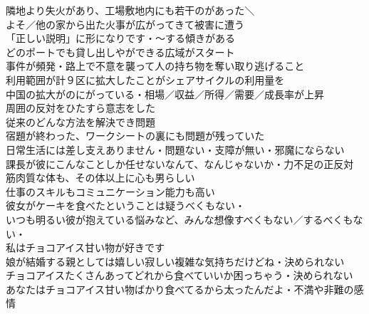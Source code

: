 隣地より失火があり、工場敷地内にも若干のがあった＼\\
よそ／他の家から出た火事が広がってきて被害に遭う\\
「正しい説明」に形になりです・〜する傾きがある\\
どのポートでも貸し出しやができる広域がスタート\\
事件が頻発・路上で不意を襲って人の持ち物を奪い取り逃げること\\
利用範囲が計９区に拡大したことがシェアサイクルの利用量を\\
中国の拡大がのにがっている・相場／収益／所得／需要／成長率が上昇\\

周囲の反対をひたすら意志をした\\
従来のどんな方法を解決でき問題\\
宿題が終わった、ワークシートの裏にも問題が残っていた\\
日常生活には差し支えありません・問題ない・支障が無い・邪魔にならない\\
課長が彼にこんなことしか任せないなんて、なんじゃないか・力不足の正反対\\

筋肉質な体も、その体以上に心も男らしい\\
仕事のスキルもコミュニケーション能力も高い\\
彼女がケーキを食べたということは疑うべくもない・\\
いつも明るい彼が抱えている悩みなど、みんな想像すべくもない／するべくもない・\\

私はチョコアイス甘い物が好きです\\
娘が結婚する親としては嬉しい寂しい複雑な気持ちだけどね・決められない\\
チョコアイスたくさんあってどれから食べていいか困っちゃう・決められない\\
あなたはチョコアイス甘い物ばかり食べてるから太ったんだよ・不満や非難の感情\\

